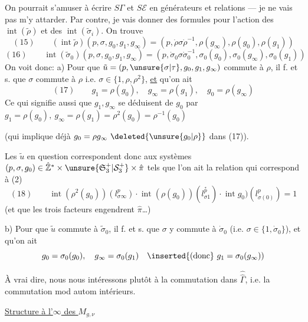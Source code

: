 On pourrait s'amuser à écrire $S\Gamma$ et $S\mathcal E$ en générateurs et relations --- je ne vais pas m'y attarder. Par contre, je vais donner des formules pour l'action des $\operatorname{int}(\tilde\rho)$ et des $\operatorname{int}(\tilde\sigma_i)$. On trouve
\[
(15)\qquad(\operatorname{int}\tilde\rho)(p,\sigma,g_0,g_1,g_\infty)=(p,\dot\rho\sigma\dot\rho^{-1},\rho(g_\infty),\rho(g_0),\rho(g_1))
\]
\[
(16)\qquad\operatorname{int}(\tilde\sigma_0)(p,\sigma,g_0,g_1,g_\infty)=(p,\dot\sigma_0\sigma\dot\sigma_0^{-1},\sigma_0(g_0),\sigma_0(g_\infty),\sigma_0(g_1))
\]
On voit donc: a) Pour que $\tilde u=(p,\unsure{\sigma|\tau},g_0,g_1,g_\infty)$ commute à $\rho$, il f. et s. que  $\sigma$ commute à $\rho$ i.e. $\sigma\in\{1,\rho,\rho^2\}$, \uline{et} qu'on ait
\[
(17)\qquad g_1=\rho(g_0),\quad g_\infty=\rho(g_1),\quad g_0=\rho(g_\infty)
\]
Ce qui signifie aussi que $g_1,g_\infty$ se déduisent de $g_0$ par $g_1=\rho(g_0),\ g_\infty=\rho(g_1)=\rho^2(g_0)=\rho^{-1}(g_0)$

(qui implique déjà $g_0=\rho g_\infty\ \deleted{\unsure{g_0|\rho}}$ dans (17)).

Les $\tilde u$ en question correspondent donc aux systèmes $(p,\sigma,g_0)\in\hat{\mathbb Z}^*\times\unsure{\mathfrak S_3^+|\mathcal S_3^+}\times\hat\pi$ tels que l'on ait la relation qui correspond à (2)
\[
(18)\qquad\operatorname{int}(\rho^2(g_0))(l_{\sigma\infty}^p)\cdot\operatorname{int}(\rho(g_0))(l_{\sigma1}^{\overset{*}{p}})\cdot\operatorname{int}g_0)(l_{\sigma(0)}^p)=1
\]
(et que les trois facteurs engendrent $\hat\pi$\ldots)

b) Pour que $\tilde u$ commute à $\tilde\sigma_0$, il f. et s. que $\sigma$ y commute à $\dot\sigma_0$ (i.e. $\sigma\in\{1,\dot\sigma_0\}$), et qu'on ait
\[
g_0=\sigma_0(g_0),\quad g_\infty=\sigma_0(g_1)\quad\inserted{\text{(donc}}\ g_1=\sigma_0(g_\infty))
\]



À vrai dire, nous nous intéressons plutôt à la commutation dans $\widehat{\widehat\Gamma}$, i.e. la commutation mod autom intérieurs.


\uline{Structure à l'$\infty$ des $M_{g,\nu}$}

